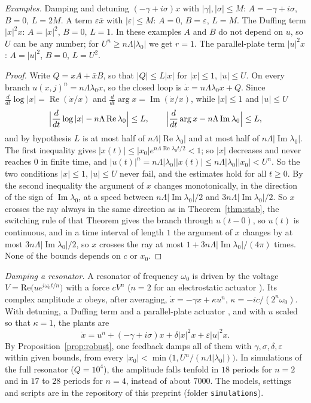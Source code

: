 \documentclass[11pt,reqno]{amsart}
\theoremstyle{plain}
\theoremstyle{definition}
\theoremstyle{remark}
\begin{document}
\emph{Examples.} Damping and detuning $(-\gamma+i\sigma)x$ with $|\gamma|,|\sigma|\le M$: $A=-\gamma+i\sigma$, $B=0$, $L=2M$. A term $\varepsilon\bar x$ with $|\varepsilon|\le M$: $A=0$, $B=\varepsilon$, $L=M$. The Duffing term $|x|^{2}x$: $A=|x|^{2}$, $B=0$, $L=1$. In these examples $A$ and $B$ do not depend on $u$, so $U$ can be any number; for $U^{n}\ge n\Lambda|\lambda_0|$ we get $r=1$. The parallel-plate term $|u|^{2}x$: $A=|u|^{2}$, $B=0$, $L=U^{2}$.

\begin{proof}
Write $Q=xA+\bar xB$, so that $|Q|\le L|x|$ for $|x|\le1$, $|u|\le U$. On every branch $u(x,j)^{n}=n\Lambda\lambda_0x$, so the closed loop is $\dot x=n\Lambda\lambda_0x+Q$. Since $\frac{d}{dt}\log|x|=\operatorname{Re}(\dot x/x)$ and $\frac{d}{dt}\arg x=\operatorname{Im}(\dot x/x)$, while $|x|\le1$ and $|u|\le U$
\[
  \Bigl|\frac{d}{dt}\log|x|-n\Lambda\operatorname{Re}\lambda_0\Bigr|\le L,\qquad
  \Bigl|\frac{d}{dt}\arg x-n\Lambda\operatorname{Im}\lambda_0\Bigr|\le L,
\]
and by hypothesis $L$ is at most half of $n\Lambda|\operatorname{Re}\lambda_0|$ and at most half of $n\Lambda|\operatorname{Im}\lambda_0|$. The first inequality gives $|x(t)|\le|x_0|e^{n\Lambda\operatorname{Re}\lambda_0t/2}<1$; so $|x|$ decreases and never reaches $0$ in finite time, and $|u(t)|^{n}=n\Lambda|\lambda_0||x(t)|\le n\Lambda|\lambda_0||x_0|<U^{n}$. So the two conditions $|x|\le1$, $|u|\le U$ never fail, and the estimates hold for all $t\ge0$. By the second inequality the argument of $x$ changes monotonically, in the direction of the sign of $\operatorname{Im}\lambda_0$, at a speed between $n\Lambda|\operatorname{Im}\lambda_0|/2$ and $3n\Lambda|\operatorname{Im}\lambda_0|/2$. So $x$ crosses the ray always in the same direction as in Theorem~\ref{thm:stab}, the switching rule of that Theorem gives the branch through $u(t-0)$, so $u(t)$ is continuous, and in a time interval of length $1$ the argument of $x$ changes by at most $3n\Lambda|\operatorname{Im}\lambda_0|/2$, so $x$ crosses the ray at most $1+3n\Lambda|\operatorname{Im}\lambda_0|/(4\pi)$ times. None of the bounds depends on $c$ or $x_0$.
\end{proof}

\medskip
\emph{Damping a resonator.} A resonator of frequency $\omega_0$ is driven by the voltage $V=\mathrm{Re}\bigl(ue^{i\omega_0t/n}\bigr)$ with a force $cV^{n}$ ($n=2$ for an electrostatic actuator \cite{MalufWilliams2004,KassieLeviElata2020}). Its complex amplitude $x$ obeys, after averaging, $\dot x=-\gamma x+\kappa u^{n}$, $\kappa=-ic/(2^{n}\omega_0)$. With detuning, a Duffing term and a parallel-plate actuator \cite{KovacicBrennan2011,Younis2011}, and with $u$ scaled so that $\kappa=1$, the plants are
\[
  \dot x=u^{n}+(-\gamma+i\sigma)x+\delta|x|^{2}x+\varepsilon|u|^{2}x .
\]
By Proposition~\ref{prop:robust}, one feedback damps all of them with $\gamma,\sigma,\delta,\varepsilon$ within given bounds, from every $|x_0|<\min\bigl(1,U^{n}/(n\Lambda|\lambda_0|)\bigr)$. In simulations of the full resonator ($Q=10^{4}$), the amplitude falls tenfold in $18$ periods for $n=2$ and in $17$ to $28$ periods for $n=4$, instead of about $7000$. The models, settings and scripts are in the repository of this preprint (folder \texttt{simulations}).
\end{document}
